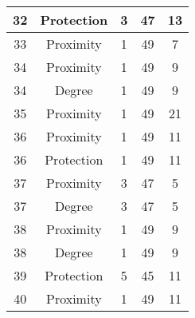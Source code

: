 \documentclass[results.tex]{subfiles}
\begin{document}
\begin{center}
\begin{tabular}{| c || c | c | c | c |}
            \hline
            32                      & Protection                   & 3                      & 47                      & 13                   \\
            \hline
            33                      & Proximity                    & 1                      & 49                      & 7                    \\
            \hline
            34                      & Proximity                    & 1                      & 49                      & 9                    \\
            \hline
            34                      & Degree                       & 1                      & 49                      & 9                    \\
            \hline
            35                      & Proximity                    & 1                      & 49                      & 21                   \\
            \hline
            36                      & Proximity                    & 1                      & 49                      & 11                   \\
            \hline
            36                      & Protection                   & 1                      & 49                      & 11                   \\
            \hline
            37                      & Proximity                    & 3                      & 47                      & 5                    \\
            \hline
            37                      & Degree                       & 3                      & 47                      & 5                    \\
            \hline
            38                      & Proximity                    & 1                      & 49                      & 9                    \\
            \hline
            38                      & Degree                       & 1                      & 49                      & 9                    \\
            \hline
            39                      & Protection                   & 5                      & 45                      & 11                   \\
            \hline
            40                      & Proximity                    & 1                      & 49                      & 11                   \\

\end{tabular}
\end{center}
\end{document}

